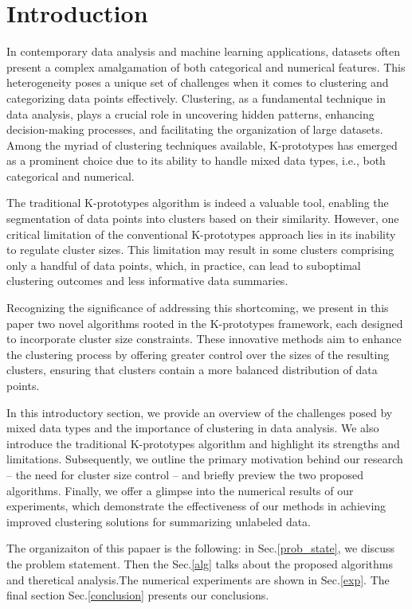 \section{Introduction}
\label{intro}

In contemporary data analysis and machine learning applications, datasets often present a complex amalgamation of both categorical and numerical features. This heterogeneity poses a unique set of challenges when it comes to clustering and categorizing data points effectively. Clustering, as a fundamental technique in data analysis, plays a crucial role in uncovering hidden patterns, enhancing decision-making processes, and facilitating the organization of large datasets. Among the myriad of clustering techniques available, K-prototypes has emerged as a prominent choice due to its ability to handle mixed data types, i.e., both categorical and numerical.

The traditional K-prototypes algorithm is indeed a valuable tool, enabling the segmentation of data points into clusters based on their similarity. However, one critical limitation of the conventional K-prototypes approach lies in its inability to regulate cluster sizes. This limitation may result in some clusters comprising only a handful of data points, which, in practice, can lead to suboptimal clustering outcomes and less informative data summaries.

Recognizing the significance of addressing this shortcoming, we present in this paper two novel algorithms rooted in the K-prototypes framework, each designed to incorporate cluster size constraints. These innovative methods aim to enhance the clustering process by offering greater control over the sizes of the resulting clusters, ensuring that clusters contain a more balanced distribution of data points.

In this introductory section, we provide an overview of the challenges posed by mixed data types and the importance of clustering in data analysis. We also introduce the traditional K-prototypes algorithm and highlight its strengths and limitations. Subsequently, we outline the primary motivation behind our research – the need for cluster size control – and briefly preview the two proposed algorithms. Finally, we offer a glimpse into the numerical results of our experiments, which demonstrate the effectiveness of our methods in achieving improved clustering solutions for summarizing unlabeled data.

The organizaiton of this papaer is the following:
in Sec.\ref{prob_state}, we discuss the problem statement. Then the Sec.\ref{alg} talks about the proposed algorithms and theretical analysis.The numerical experiments are shown in Sec.\ref{exp}. The final section Sec.\ref{conclusion} presents our conclusions.